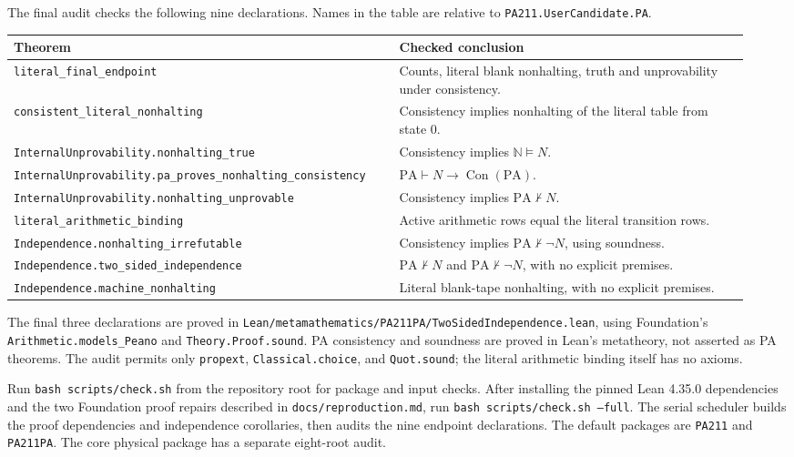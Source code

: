 \documentclass[11pt,letterpaper]{article}
\newcommand{\PA}{\mathrm{PA}}
\newcommand{\NN}{\mathbb{N}}
\newcommand{\Con}{\operatorname{Con}}
\newcommand{\repo}[1]{\texttt{\nolinkurl{#1}}}
\begin{document}
\noindent\begin{minipage}{\linewidth}
The final audit checks the following nine declarations. Names in the
table are relative to \texttt{PA211.UserCandidate.PA}.
\begin{center}\small
\begin{tabular}{@{}p{0.49\linewidth}p{0.45\linewidth}@{}}
\toprule
Theorem & Checked conclusion \\
\midrule
\repo{literal_final_endpoint} & Counts, literal blank nonhalting, truth and unprovability under consistency. \\
\repo{consistent_literal_nonhalting} & Consistency implies nonhalting of the literal table from state 0. \\
\repo{InternalUnprovability.nonhalting_true} & Consistency implies $\NN\models N$. \\
\repo{InternalUnprovability.pa_proves_nonhalting_consistency} & $\PA\vdash N\to\Con(\PA)$. \\
\repo{InternalUnprovability.nonhalting_unprovable} & Consistency implies $\PA\nvdash N$. \\
\repo{literal_arithmetic_binding} & Active arithmetic rows equal the literal transition rows. \\
\repo{Independence.nonhalting_irrefutable} & Consistency implies $\PA\nvdash\neg N$, using soundness. \\
\repo{Independence.two_sided_independence} & $\PA\nvdash N$ and $\PA\nvdash\neg N$, with no explicit premises. \\
\repo{Independence.machine_nonhalting} & Literal blank-tape nonhalting, with no explicit premises. \\
\bottomrule
\end{tabular}
\end{center}
\end{minipage}\par\medskip

The final three declarations are proved in
\repo{Lean/metamathematics/PA211PA/TwoSidedIndependence.lean}, using
Foundation's \texttt{Arithmetic.models\_Peano} and
\texttt{Theory.Proof.sound}. PA consistency and soundness are proved in
Lean's metatheory, not asserted as PA theorems. The audit permits only
\texttt{propext}, \texttt{Classical.choice}, and \texttt{Quot.sound}; the
literal arithmetic binding itself has no axioms.

Run \texttt{bash scripts/check.sh} from the repository root for package
and input checks. After installing the pinned Lean 4.35.0 dependencies
and the two Foundation proof repairs described in
\repo{docs/reproduction.md}, run \texttt{bash scripts/check.sh --full}.
The serial scheduler builds the proof dependencies and independence
corollaries, then audits the nine endpoint declarations. The default
packages are \texttt{PA211} and \texttt{PA211PA}. The core physical
package has a separate eight-root audit.
\end{document}
